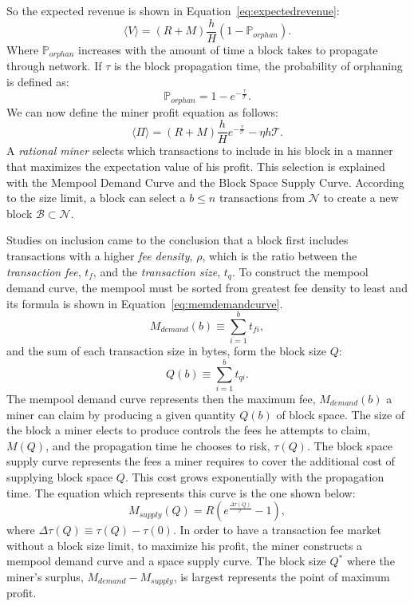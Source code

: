 \documentclass[USenglish]{uit-thesis}
\begin{document}
So the expected revenue is shown in Equation~\ref{eq:expectedrevenue}:
\begin{equation}
\label{eq:expectedrevenue}
\langle V\rangle = \left(R + M\right)\frac{h}{H}\left(1 - \mathbb{P}_{orphan}\right).
\end{equation}
Where $\mathbb{P}_{orphan}$
increases with the amount of time a block takes
to propagate through network. If $\tau$ is
the block propagation time, the
probability of orphaning is defined as:
\begin{equation}
\label{eq:orphaning}
\mathbb{P}_{orphan} = 1 - e^{-\frac{\tau}{\mathcal{T}}}.
\end{equation}
We can now define the miner profit equation as follows:
\begin{equation}
\label{eq:minerprofiteq}
\langle \Pi \rangle = (R + M)\frac{h}{H} e^{-\frac{\tau}{\mathcal{T}}} -\eta h\mathcal{T}.
\end{equation}
A \emph{rational miner} selects which
transactions to include in his block in a manner that maximizes
the expectation value of his profit. This
selection is explained with the Mempool Demand Curve
and the Block Space Supply Curve.
According to the size limit, a block can select a $b \leq n$
transactions from $\mathcal{N}$ to create a
new block $\mathcal{B} \subset \mathcal{N}$.


Studies on inclusion came to the
conclusion that a block first includes transactions
with a higher \emph{fee density}, $\rho$,
which is the ratio between
the \emph{transaction fee}, $t_f$, and
the \emph{transaction size}, $t_q$.
To construct the mempool demand
curve, the mempool must be sorted from
greatest fee density to least and its
formula is shown in Equation~\ref{eq:memdemandcurve}.
\begin{equation}
\label{eq:memdemandcurve}
M_{demand}(b) \equiv \sum_{i=1}^{b} t_{fi},
\end{equation}
and the sum of each transaction size in bytes, form the
block size $Q$:
\begin{equation}
\label{eq:transactionsize}
Q(b) \equiv \sum_{i = 1}^{b} t_{qi}.
\end{equation}
The mempool demand curve represents then
the maximum fee, $M_{demand}(b)$
a miner can claim by producing
a given quantity $Q(b)$ of block space.
The size of the block a miner elects to
produce controls the fees he attempts to claim, $M(Q)$,
and the propagation time he chooses to risk, $\tau(Q)$.
The block space supply curve represents
the fees a miner requires to cover the additional cost of
supplying block space $Q$. This cost grows
exponentially with the propagation time. The equation which
represents this curve is the one shown below:
\begin{equation}
\label{eq:blockspacesupply}
M_{supply}(Q) = R\left(e^{\frac{\Delta \tau (Q)}{\mathcal{T}}} - 1\right),
\end{equation}
where $\Delta \tau (Q) \equiv \tau(Q) - \tau(0)$.
In order to have a transaction fee market
without a block size limit, to maximize his profit,
the miner constructs a mempool
demand curve and a space supply curve.
The block size $Q^*$ where the miner's surplus,
$M_{demand} - M_{supply}$, is largest represents
the point of maximum profit.
\end{document}
